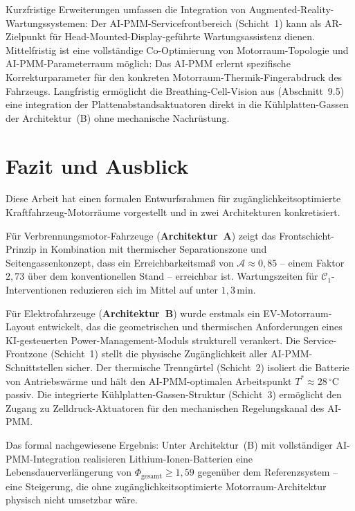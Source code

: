 ﻿\documentclass[12pt,a4paper]{article}
\begin{document}
Kurzfristige Erweiterungen umfassen die Integration von Augmented-Reality-Wartungs\-systemen:
Der AI-PMM-Servicefrontbereich (Schicht~1) kann als AR-Zielpunkt für
Head-Mounted-Display-geführte Wartungsassistenz dienen. Mittelfristig ist
eine vollständige Co-Optimierung von Motorraum-Topologie und AI-PMM-Parameterraum
möglich: Das AI-PMM erlernt spezifische Korrekturparameter für den
konkreten Motorraum-Thermik-Fingerabdruck des Fahrzeugs. Langfristig
ermöglicht die Breathing-Cell-Vision aus \cite{Epp2026liion} (Abschnitt~9.5)
eine integration der Plattenabstandsaktuatoren direkt in die Kühlplatten-Gassen
der Architektur~(B) ohne mechanische Nachrüstung.

\section{Fazit und Ausblick}
\label{sec:fazit}

Diese Arbeit hat einen formalen Entwurfsrahmen für zugänglichkeitsoptimierte
Kraftfahr\-zeug-Motorräume vorgestellt und in zwei Architekturen konkretisiert.

Für Verbrennungsmotor-Fahrzeuge (\textbf{Architektur~A}) zeigt das
Frontschicht-Prinzip in Kombination mit thermischer Separationszone und
Seitengassenkonzept, dass ein Erreichbarkeitsmaß von $\mathcal{A} \approx 0{,}85$
-- einem Faktor $2{,}73$ über dem konventionellen Stand -- erreichbar ist.
Wartungszeiten für $\mathcal{C}_1$-Interventionen reduzieren sich im Mittel
auf unter $1{,}3\,\mathrm{min}$.

Für Elektrofahrzeuge (\textbf{Architektur~B}) wurde erstmals ein EV-Motorraum-Layout
entwickelt, das die geometrischen und thermischen Anforderungen eines KI-gesteuerten
Power-Management-Moduls \cite{Epp2026liion} strukturell verankert. Die Service-Frontzone
(Schicht~1) stellt die physische Zugänglichkeit aller AI-PMM-Schnittstellen sicher.
Der thermische Trenngürtel (Schicht~2) isoliert die Batterie von Antriebswärme und
hält den AI-PMM-optimalen Arbeitspunkt $T^* \approx 28\,^\circ\mathrm{C}$ passiv.
Die integrierte Kühlplatten-Gassen-Struktur (Schicht~3) ermöglicht den Zugang zu
Zelldruck-Aktuatoren für den mechanischen Regelungskanal des AI-PMM.

Das formal nachgewiesene Ergebnis: Unter Architektur~(B) mit vollständiger
AI-PMM-Integration realisieren Lithium-Ionen-Batterien eine Lebensdauerverlängerung
von $\Phi_\mathrm{gesamt} \geq 1{,}59$ gegenüber dem Referenzsystem -- eine
Steigerung, die ohne zugänglichkeitsoptimierte Motorraum-Architektur physisch
nicht umsetzbar wäre.
\end{document}
